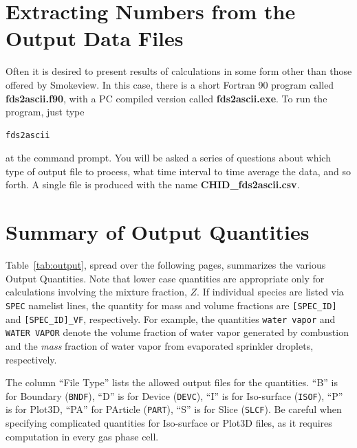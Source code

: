 \documentclass[11pt]{book}
\newcommand{\ct}{\tt\small}
\begin{document}
\section{Extracting Numbers from the Output Data Files}
\label{info:fds2ascii} 

Often it is desired to present results of calculations in some form other
than those offered by Smokeview. In this case, there is a short
Fortran 90 program called {\bf fds2ascii.f90}, with a PC compiled version
called {\bf fds2ascii.exe}. To run the program, just type
\begin{verbatim}
fds2ascii
\end{verbatim}
at the command prompt. You will be asked a series of questions
about which type of output file to process, what time interval to
time average the data, and so forth. A single file is produced
with the name {\bf CHID\_fds2ascii.csv}.


\clearpage
\section{Summary of Output Quantities}
\label{info:outputquantities} 

Table~\ref{tab:output}, spread over the following pages, summarizes the various Output Quantities.
Note that lower case quantities are appropriate only for calculations involving the mixture fraction, $Z$. If
individual species are listed via {\ct SPEC} namelist lines, the quantity for mass and volume
fractions are {\ct [SPEC\_ID]} and {\ct [SPEC\_ID]\_VF}, respectively. For example, the quantities
{\ct water vapor} and {\ct WATER VAPOR} denote the volume fraction of water vapor
generated by combustion and the {\em mass} fraction of water vapor from evaporated sprinkler
droplets, respectively.

The column ``File Type'' lists the allowed output files for the quantities. ``B'' is for Boundary ({\ct BNDF}),
``D'' is for Device ({\ct DEVC}), ``I'' is for Iso-surface ({\ct ISOF}), ``P'' is for Plot3D, ``PA'' for PArticle ({\ct PART}),
``S'' is for Slice ({\ct SLCF}). Be careful
when specifying complicated quantities for Iso-surface or Plot3D files, as it requires computation in every gas phase cell.
\end{document}
